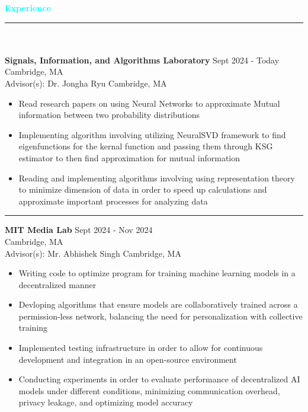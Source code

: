\documentclass[letterpaper,12pt]{article}
\newcommand{\code}[1]{\fontfamily{lmss}\selectfont #1}
\newcommand*\tick{\item[\faAngleRight]}
\begin{document}
\begin{minipage}{18cm}
    \Large\code{\textcolor{aqua}{\textbf{Experience}}} \textcolor{aqua}{\rule[0.5ex]{16.25cm}{1px}} \\
    \hfill\\ \large\color{black}\code{\textbf{Signals, Information, and Algorithms Laboratory}} \hfill Sept 2024 - Today \\
    \normalsize \code{} \hfill \normalsize Cambridge, MA \\
     \small Advisor(s): Dr. Jongha Ryu \hfill \normalsize \color{white} Cambridge, MA 
    
    \color{darkgray}\begin{itemize}
        \tick Read research papers on using Neural Networks to approximate Mutual information between two \newline
        probability distributions
        \tick Implementing algorithm involving utilizing NeuralSVD framework to find eigenfunctions for the kernal function and passing them through KSG estimator to then find approximation for mutual information
        \tick Reading and implementing algorithms involving using representation theory to minimize dimension of data in order to speed up calculations and approximate important processes for analyzing data
    \end{itemize}

    \textcolor{aqua}{\rule[0.5ex]{19.25cm}{1px}}
    
     \large\color{black} \code{\textbf{MIT Media Lab}} \hfill \large{Sept 2024 - Nov 2024} \\
    \normalsize \code{} \hfill \normalsize Cambridge, MA \\
        \small Advisor(s): Mr. Abhishek Singh \hfill \normalsize \color{white} Cambridge, MA 

    
    \color{darkgray}\begin{itemize}
        \tick Writing code to optimize program for training machine learning models in a decentralized manner
        \tick Devloping algorithms that ensure models are collaboratively trained across a permission-less network, balancing the need for personalization with collective training
        \tick Implemented testing infrastructure in order to allow for continuous development and integration in an open-source environment
        \tick Conducting experiments in order to evaluate performance of decentralized AI models under different conditions, minimizing communication overhead, privacy leakage, and optimizing model accuracy
\end{itemize}


\end{minipage}
\end{document}

